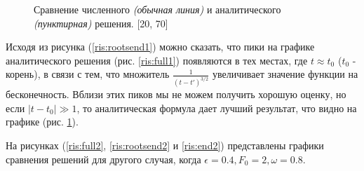 \documentclass[14pt]{article}
\numberwithin{figure}{section}
\numberwithin{equation}{section}
\begin{document}
\begin{figure}[h]
	\caption{Сравнение численного \textit{(обычная линия)} и аналитического \textit{(пунктирная)} решения. [20, 70]}
	\label{ris:end1}
\end{figure}

Исходя из рисунка (\ref{ris:rootsend1}) можно сказать, что пики на графике аналитического решения (рис. \ref{ris:full1}) появляются в тех местах, где $t\approx t_0$ ($t_0$ - корень), в связи с тем, что множитель $\frac{1}{(t-t')^{3/2}}$ увеличивает значение функции на бесконечность.
Вблизи этих пиков мы не можем получить хорошую оценку, но если $|t-t_0|\gg 1$,  то аналитическая формула дает лучший результат, что видно на графике (рис. \ref{ris:end1}).

На рисунках (\ref{ris:full2}, \ref{ris:rootsend2} и \ref{ris:end2}) представлены графики сравнения решений для другого случая, когда $\epsilon = 0.4, F_0 = 2, \omega = 0.8$.
\end{document}
